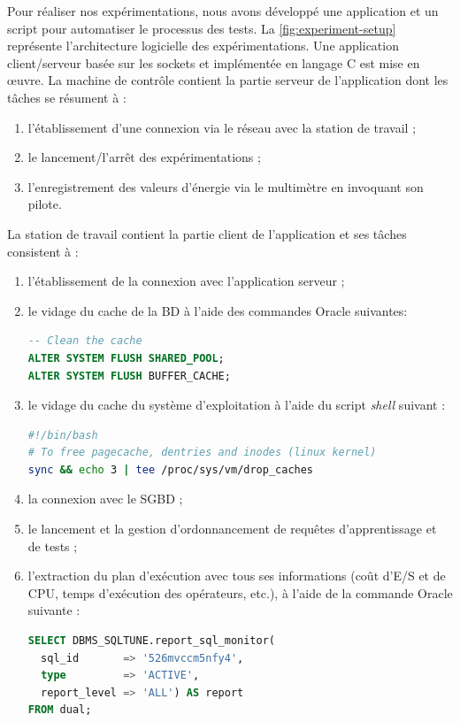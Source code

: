 Pour réaliser nos expérimentations, nous avons développé une application et un script pour automatiser le processus des tests. La \ref{fig:experiment-setup} représente l'architecture logicielle des expérimentations. Une application client/serveur basée sur les sockets et implémentée en langage C est mise en œuvre. La machine de contrôle contient la partie serveur de l'application dont les tâches se résument à :
\begin{enumerate}
 \item l'établissement d'une connexion via le réseau avec la station de travail ;
 \item le lancement/l'arrêt des expérimentations ;
 \item l'enregistrement des valeurs d'énergie via le multimètre en invoquant son pilote.
\end{enumerate}

La station de travail contient la partie client de l'application  et ses tâches consistent à :
\begin{enumerate}
 \item l'établissement de la connexion avec l'application serveur ;
 \item le vidage du cache de la BD à l'aide des commandes Oracle suivantes:
 \begin{lstlisting}[language=sql]
-- Clean the cache
ALTER SYSTEM FLUSH SHARED_POOL;
ALTER SYSTEM FLUSH BUFFER_CACHE;
\end{lstlisting}
 \item le vidage du cache du système d'exploitation à l'aide du script \textit{shell} suivant :
 \begin{lstlisting}[language=bash]
#!/bin/bash
# To free pagecache, dentries and inodes (linux kernel)
sync && echo 3 | tee /proc/sys/vm/drop_caches
\end{lstlisting}
 \item la connexion avec le SGBD ;
 \item le lancement et la gestion d'ordonnancement de requêtes d'apprentissage et de tests ;
 \item l'extraction du plan d'exécution avec tous ses informations (coût d'E/S et de CPU, temps d'exécution des opérateurs, etc.), à l'aide de la commande Oracle suivante :
 \begin{lstlisting}[language=sql]
SELECT DBMS_SQLTUNE.report_sql_monitor(
  sql_id       => '526mvccm5nfy4',
  type         => 'ACTIVE',
  report_level => 'ALL') AS report
FROM dual;
\end{lstlisting}
\end{enumerate}


